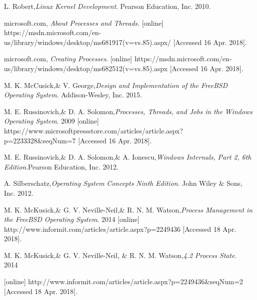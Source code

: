 \documentclass[letterpaper,draftclsnofoot,journal,compsoc,10pt,onecolumn]{IEEEtran}
\begin{document}
    
\newpage
\begin{thebibliography}{14}

L. Robert,\textit{Linux Kernel Development}. Pearson Education, Inc. 2010.

microsoft.com, \textit{About Processes and Threads}. [online] https://msdn.microsoft.com/en-us/library/windows/desktop/ms681917(v=vs.85).aspx/ [Accessed 16 Apr. 2018].

microsoft.com, \textit{Creating Processes}. [online] https://msdn.microsoft.com/en-us/library/windows/desktop/ms682512(v=vs.85).aspx [Accessed 16 Apr. 2018].

M. K. McCusick,\& V. George,\textit{Design and Implementation of the FreeBSD Operating System}.  Addison-Wesley, Inc. 2015.

M. E. Russinovich,\&  D. A. Solomon,\textit{Processes, Threads, and Jobs in the Windows Operating System}. 2009 [online] https://www.microsoftpressstore.com/articles/article.aspx?p=2233328\&seqNum=7 [Accessed 16 Apr. 2018].

M. E. Russinovich,\& D. A. Solomon,\&  A. Ionescu,\textit{Windows Internals, Part 2, 6th Edition}.Pearson Education, Inc. 2012.

A. Silberschatz,\textit{Operating System Concepts Ninth Edition}. John Wiley \& Sons, Inc. 2012.

M. K. McKusick,\& G. V. Neville-Neil,\& R. N. M. Watson,\textit{Process Management in the FreeBSD Operating System}. 2014 [online] http://www.informit.com/articles/article.aspx?p=2249436 [Accessed 18 Apr. 2018].

M. K. McKusick,\& G. V. Neville-Neil, \& R. N. M. Watson,\textit{4.2 Process State}. 2014 

[online] http://www.informit.com/articles/article.aspx?p=2249436\&seqNum=2 [Accessed 18 Apr. 2018].

\end{thebibliography}
\end{document}
